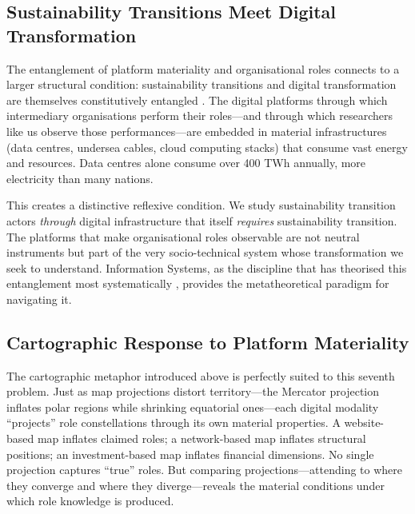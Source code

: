 \documentclass[../main.tex]{subfiles}
\begin{document}
\subsection{Sustainability Transitions Meet Digital Transformation}

The entanglement of platform materiality and organisational roles connects to a larger structural condition: sustainability transitions and digital transformation are themselves constitutively entangled \cite{owoyele2025datacentering}. The digital platforms through which intermediary organisations perform their roles---and through which researchers like us observe those performances---are embedded in material infrastructures (data centres, undersea cables, cloud computing stacks) that consume vast energy and resources. Data centres alone consume over 400 TWh annually, more electricity than many nations.

This creates a distinctive reflexive condition. We study sustainability transition actors \emph{through} digital infrastructure that itself \emph{requires} sustainability transition. The platforms that make organisational roles observable are not neutral instruments but part of the very socio-technical system whose transformation we seek to understand. Information Systems, as the discipline that has theorised this entanglement most systematically \cite{cecezkecmanovic2014sociomateriality,plantin2018infrastructure}, provides the metatheoretical paradigm for navigating it.

\subsection{Cartographic Response to Platform Materiality}

The cartographic metaphor introduced above is perfectly suited to this seventh problem. Just as map projections distort territory---the Mercator projection inflates polar regions while shrinking equatorial ones---each digital modality ``projects'' role constellations through its own material properties. A website-based map inflates claimed roles; a network-based map inflates structural positions; an investment-based map inflates financial dimensions. No single projection captures ``true'' roles. But comparing projections---attending to where they converge and where they diverge---reveals the material conditions under which role knowledge is produced.
\end{document}
